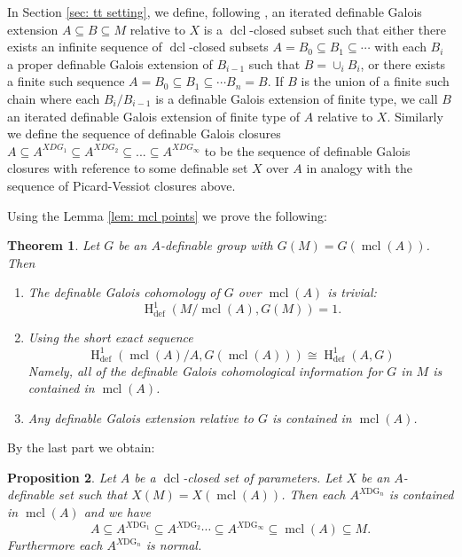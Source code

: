 \documentclass{amsart}
\newtheorem{theorem}{Theorem}[section]
\newtheorem{proposition}[theorem]{Proposition}
\theoremstyle{definition}
\theoremstyle{remark}
\numberwithin{equation}{section}
\def \defin {\operatorname{def}}
\def \HH {\operatorname{H}}
\def \mcl {\operatorname{mcl}}
\def \dcl {\operatorname{dcl}}
\begin{document}
In Section \ref{sec: tt setting}, we define, following \cite{meretzky2026galoistheoryautomorphismgroups}, an iterated definable Galois extension $A \subseteq B \subseteq M$ relative to $X$ is a $\dcl$-closed subset such that either there exists an infinite sequence of $\dcl$-closed subsets $A=B_0 \subseteq B_1 \subseteq \cdots $ with each $B_i$ a proper definable Galois extension of $B_{i-1}$ such that $B= \cup_iB_i$, or there exists a finite such sequence $A=B_0 \subseteq B_1 \subseteq \cdots B_n=B$. If $B$ is the union of a finite such chain where each $B_i/B_{i-1}$ is a definable Galois extension of finite type, we call $B$ an iterated definable Galois extension of finite type of $A$ relative to $X$. Similarly we define the sequence of definable Galois closures $A \subseteq A^{XDG_1} \subseteq A^{XDG_2} \subseteq ... \subseteq A^{XDG_\infty}$ to be the sequence of definable Galois closures with reference to some definable set $X$ over $A$ in analogy with the sequence of Picard-Vessiot closures above. 

Using the Lemma \ref{lem: mcl points} we prove the following: 

\begin{theorem}\relax
    Let $G$ be an $A$-definable group with $G(M) = G(\mcl(A))$. Then
    \begin{enumerate}
        \item The definable Galois cohomology of $G$ over $\mcl(A)$ is trivial: $$\HH^1_{\defin}(M/\mcl(A),G(M)) = 1.$$
        \item Using the short exact sequence $$\HH^1_{\defin}(\mcl(A)/A,G(\mcl(A))) \cong \HH^1_{\defin}(A,G)$$ Namely, all of the definable Galois cohomological information for $G$ in $M$ is contained in $\mcl(A)$.
        \item Any definable Galois extension relative to $G$ is contained in $\mcl(A)$.
    \end{enumerate}
\end{theorem}

By the last part we obtain:

\begin{proposition}
    Let $A$ be a $\dcl$-closed set of parameters. Let $X$ be an $A$-definable set such that $X(M) = X(\mcl(A))$. Then each $A^{X\text{DG}_n}$ is contained in $\mcl(A)$ and we have $$A \subseteq A^{X\text{DG}_1} \subseteq A^{X\text{DG}_2} \cdots \subseteq A^{X\text{DG}_\infty} \subseteq \mcl(A) \subseteq M.$$ Furthermore each $A^{X\text{DG}_n}$ is normal.
\end{proposition}
\end{document}
